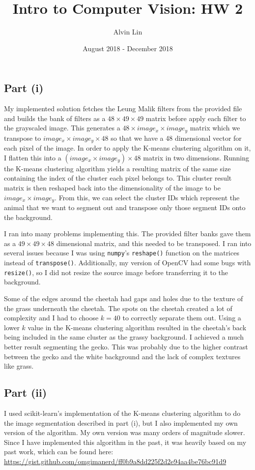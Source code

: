 \documentclass{math}
\title{Intro to Computer Vision: HW 2}
\author{Alvin Lin}
\date{August 2018 - December 2018}
\begin{document}
\maketitle
\captionsetup{justification=centering}

\subsection*{Part (i)}
My implemented solution fetches the Leung Malik filters from the provided file
and builds the bank of filters as a \( 48\times49\times49 \) matrix before apply
each filter to the grayscaled image. This generates a \( 48\times image_x\times
image_y \) matrix which we transpose to \( image_x\times image_y\times 48 \) so
that we have a 48 dimensional vector for each pixel of the image. In order to
apply the K-means clustering algorithm on it, I flatten this into a \( (image_x
\times image_y) \times 48 \) matrix in two dimensions. Running the K-means
clustering algorithm yields a resulting matrix of the same size containing
the index of the cluster each pixel belongs to. This cluster result matrix is
then reshaped back into the dimensionality of the image to be \( image_x\times
image_y \). From this, we can select the cluster IDs which represent the
animal that we want to segment out and transpose only those segment IDs onto
the background. \par
I ran into many problems implementing this. The provided filter banks gave them
as a \( 49\times49\times48 \) dimensional matrix, and this needed to be
transposed. I ran into several issues because I was using \texttt{numpy}'s
\texttt{reshape()} function on the matrices instead of \texttt{transpose()}.
Additionally, my version of OpenCV had some bugs with \texttt{resize()}, so I
did not resize the source image before transferring it to the background. \par
Some of the edges around the cheetah had gaps and holes due to the texture of
the grass underneath the cheetah. The spots on the cheetah created a lot of
complexity and I had to choose \( k = 40 \) to correctly separate them out.
Using a lower \( k \) value in the K-means clustering algorithm resulted in the
cheetah's back being included in the same cluster as the grassy background. I
achieved a much better result segmenting the gecko. This was probably due to the
higher contrast between the gecko and the white background and the lack of
complex textures like grass.

\subsection*{Part (ii)}
I used scikit-learn's implementation of the K-means clustering algorithm to do
the image segmentation described in part (i), but I also implemented my own
version of the algorithm. My own version was many orders of magnitude slower.
Since I have implemented this algorithm in the past, it was heavily based on my
past work, which can be found here: \\
\url{https://gist.github.com/omgimanerd/ff0b9a8dd225f2d2e94aa4be76bc91d9}
\end{document}
